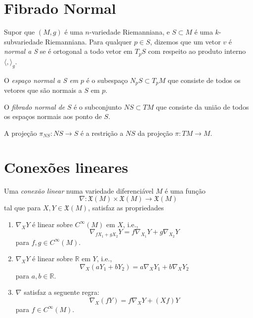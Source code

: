 \section{Fibrado Normal}

\begin{definicao}
	Supor que $(M,g)$ é uma $n$-variedade Riemanniana, e $S \subset M$ é uma $k$-subvariedade Riemanniana. Para qualquer $p \in S$, dizemos que um vetor $v$ é \emph{normal a S}  se é ortogonal a todo vetor em $T_p S$ com respeito ao produto interno $\langle , \rangle_g$.
\end{definicao}

\begin{definicao}
	O \emph{espaço normal a S em} $p$ é o subespaço $N_p S \subset T_p M$ que consiste de todos os vetores que são normais a $S$ em $p$.
\end{definicao}

\begin{definicao}
	O \emph{fibrado normal de} $S$ é o subconjunto $NS \subset TM$ que consiste da união de todos os espaços normais aos ponto de $S$.
\end{definicao}

\begin{definicao}
	A projeção $\pi_{NS}: NS \rightarrow S$ é a restrição a $NS$ da projeção $\pi: TM \rightarrow M$.
\end{definicao}

\section{Conexões lineares}

\begin{definicao}
	Uma \emph{conexão linear} numa variedade diferenciável $M$ é uma função
	\begin{equation*}
		\nabla: \mathfrak{X}(M) \times \mathfrak{X}(M) \rightarrow \mathfrak{X}(M)
	\end{equation*}
	tal que para $X,Y \in \mathfrak{X}(M)$, satisfaz as propriedades
	\begin{enumerate}
		\item $\nabla_X Y$ é linear sobre $C^\infty (M)$ em $X$, i.e.,
		\begin{equation*}
			\nabla_{f X_1 + g X_2} Y = f \nabla_{X_1} Y + g \nabla_{X_2} Y
		\end{equation*}
		para $f,g \in C^{\infty} (M)$.
		
		\item $\nabla_X Y$ é linear sobre $\mathbb{R}$ em $Y$, i.e.,
		\begin{equation*}
			\nabla_X (a Y_1 + b Y_2) = a \nabla_X Y_1 + b \nabla_X Y_2
		\end{equation*}
		para $a,b \in \mathbb{R}$.
		
		\item $\nabla$ satisfaz a seguente regra:
		\begin{equation*}
			\nabla_X (f Y) = f \nabla_X Y + (X f) Y
		\end{equation*}
		para $f \in C^{\infty}(M)$.
	\end{enumerate}
\end{definicao}

